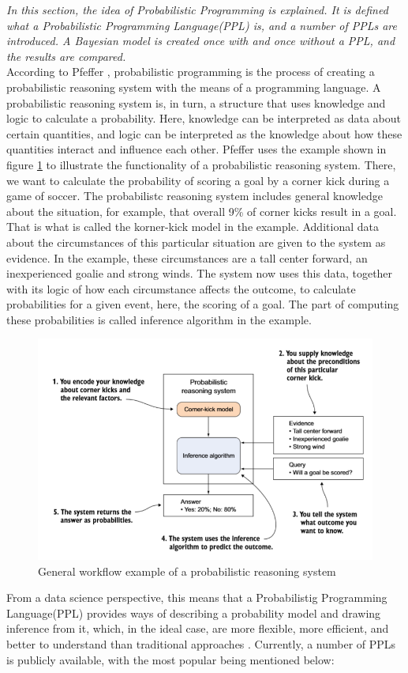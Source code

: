 \documentclass{article}
\begin{document}
\textit{In this section,  the idea of Probabilistic Programming is explained. It is defined what a Probabilistic Programming Language(PPL) is, and a number of PPLs are introduced. A Bayesian model is created once with and once without a PPL, and the results are compared.}
\\
According to Pfeffer \cite{9781617292330}, probabilistic programming is the process of creating a probabilistic reasoning system with the means of a programming language. A probabilistic reasoning system is, in turn, a structure that uses knowledge and logic to calculate a probability. Here, knowledge can be interpreted as data about certain quantities, and logic can be interpreted as the knowledge about how these quantities interact and influence each other. Pfeffer \cite{9781617292330} uses the example shown in figure \ref{fig:example_prs} to illustrate the functionality of a probabilistic reasoning system. There, we want to calculate the probability of scoring a goal by a corner kick during a game of soccer. The probabilistc reasoning system includes general knowledge about the situation, for example, that overall 9\% of corner kicks result in a goal. That is what is called the korner-kick model in the example. Additional data about the circumstances of this particular situation are given to the system as evidence. In the example, these circumstances are a tall center forward, an inexperienced goalie and strong winds. The system now uses this data, together with its logic of how each circumstance affects the outcome, to calculate probabilities for a given event, here, the scoring of a goal. The part of computing these probabilities is called inference algorithm in the example.
\begin{figure}
	\includegraphics[width=\textwidth]{images/probabilistic_reasoning_system.PNG}
	\caption[General workflow example of a probabilistic reasoning system. Source: \cite{9781617292330}]{General workflow example of a probabilistic reasoning system}
	\label{fig:example_prs}
\end{figure}
From a data science perspective, this means that a Probabilistig Programming Language(PPL) provides ways of describing a probability model and drawing inference from it, which, in the ideal case, are more flexible, more efficient, and better to understand than traditional approaches \cite{Hardesty2015}. Currently, a number of PPLs is publicly available, with the most popular being mentioned below:
\end{document}
